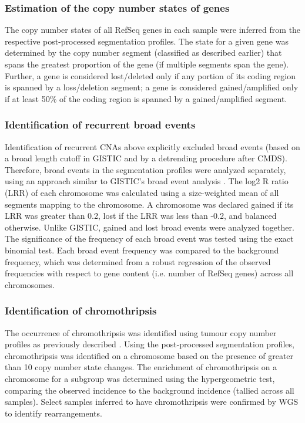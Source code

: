 \subsubsection{Estimation of the copy number states of genes}

The copy number states of all RefSeq genes in each sample were inferred from the respective post-processed segmentation profiles. The state for a given gene was determined by the copy number segment (classified as described earlier) that spans the greatest proportion of the gene (if multiple segments span the gene). Further, a gene is considered lost/deleted only if any portion of its coding region is spanned by a loss/deletion segment; a gene is considered gained/amplified only if at least 50\% of the coding region is spanned by a gained/amplified segment.

\subsubsection{Identification of recurrent broad events}

Identification of recurrent CNAs above explicitly excluded broad events (based on a broad length cutoff in GISTIC and by a detrending procedure after CMDS). Therefore, broad events in the segmentation profiles were analyzed separately, using an approach similar to GISTIC’s broad event analysis . The log2 R ratio (LRR) of each chromosome was calculated using a size-weighted mean of all segments mapping to the chromosome. A chromosome was declared gained if its LRR was greater than 0.2, lost if the LRR was less than -0.2, and balanced otherwise. Unlike GISTIC, gained and lost broad events were analyzed together. The significance of the frequency of each broad event was tested using the exact binomial test. Each broad event frequency was compared to the background frequency, which was determined from a robust regression of the observed frequencies with respect to gene content (i.e. number of RefSeq genes) across all chromosomes.

\subsubsection{Identification of chromothripsis}

The occurrence of chromothripsis was identified using tumour copy number profiles as previously described . Using the post-processed segmentation profiles, chromothripsis was identified on a chromosome based on the presence of greater than 10 copy number state changes. The enrichment of chromothripsis on a chromosome for a subgroup was determined using the hypergeometric test, comparing the observed incidence to the background incidence (tallied across all samples). Select samples inferred to have chromothripsis were confirmed by WGS to identify rearrangements.


